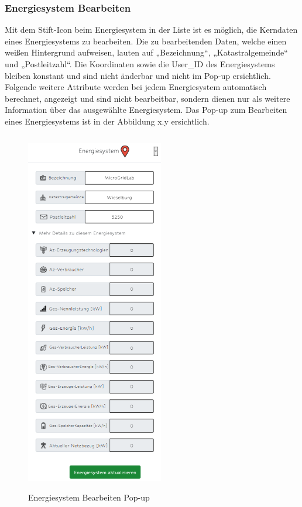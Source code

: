 \subsubsection{Energiesystem Bearbeiten}
Mit dem Stift-Icon beim Energiesystem in der Liste ist es möglich, die Kerndaten eines Energiesystems zu bearbeiten. Die zu bearbeitenden Daten, welche einen weißen Hintergrund  aufweisen, lauten auf „Bezeichnung“, „Katastralgemeinde“ und „Postleitzahl“. Die Koordinaten sowie die User\_ID des Energiesystems bleiben konstant und sind nicht änderbar und nicht im Pop-up ersichtlich.
Folgende weitere Attribute werden bei jedem Energiesystem automatisch berechnet, angezeigt und sind nicht bearbeitbar, sondern dienen nur als weitere Information über das ausgewählte Energiesystem. Das Pop-up zum Bearbeiten eines Energiesystems ist in der Abbildung x.y ersichtlich.
\begin{figure}[h]
	\centering
	\includegraphics[height=16cm,width=6cm]{images/ESbearbeitenPop}
	\caption{Energiesystem Bearbeiten Pop-up}
	\label{fig:CSS_System}
\end{figure}
\newpage

